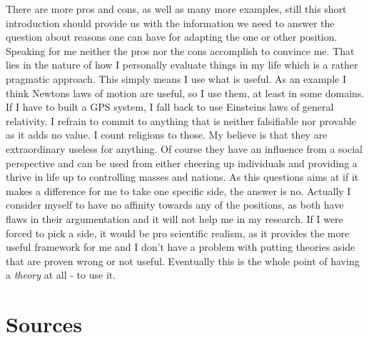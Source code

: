 \documentclass[11pt]{scrartcl}
\begin{document}
There are more pros and cons, as well as many more examples, still this short introduction should provide us with the information we need to answer the question about reasons one can have for adapting the one or other position. Speaking for me neither the pros nor the cons accomplish to convince me. That lies in the nature of how I personally evaluate things in my life which is a rather pragmatic approach. This simply means I use what is useful. As an example I think Newtons laws of motion are useful, so I use them, at least in some domains. If I have to built a GPS system, I fall back to use Einsteins laws of general relativity. I refrain to commit to anything that is neither falsifiable nor provable as it adds no value. I count religions to those. My believe is that they are extraordinary useless for anything. Of course they have an influence from a social perspective and can be used from either cheering up individuals and providing a thrive in life up to controlling masses and nations. As this questions aims at if it makes a difference for me to take one specific side, the answer is no. Actually I consider myself to have no affinity towards any of the positions, as both have flaws in their argumentation and it will not help me in my research. If I were forced to pick a side, it would be pro scientific realism, as it provides the more useful framework for me and I don't have a problem with putting theories aside that are proven wrong or not useful. Eventually this is the whole point of having a \textit{theory} at all - to use it.

\section{Sources}



\end{document}
